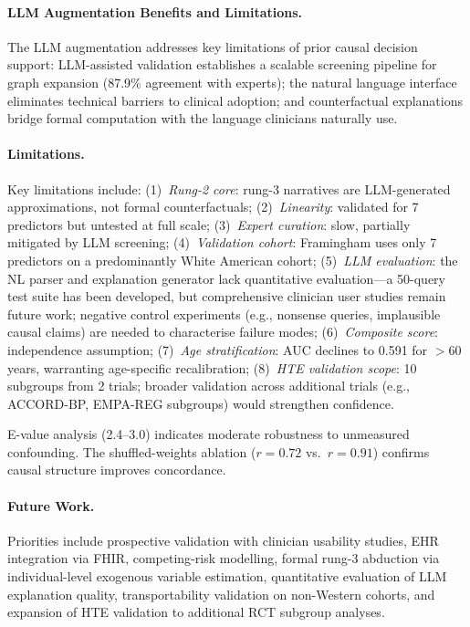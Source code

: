 \documentclass[runningheads]{llncs}
\begin{document}
\paragraph{LLM Augmentation Benefits and Limitations.}
The LLM augmentation addresses key limitations of prior causal
decision support: LLM-assisted validation establishes a scalable
screening pipeline for graph expansion (87.9\% agreement with experts);
the natural language interface eliminates technical barriers to
clinical adoption; and counterfactual explanations bridge formal
computation with the language clinicians naturally use.

\paragraph{Limitations.}
Key limitations include:
(1)~\emph{Rung-2 core}: rung-3 narratives are LLM-generated
approximations, not formal counterfactuals;
(2)~\emph{Linearity}: validated for 7 predictors but untested at
full scale;
(3)~\emph{Expert curation}: slow, partially mitigated by LLM screening;
(4)~\emph{Validation cohort}: Framingham uses only 7 predictors on a
predominantly White American cohort;
(5)~\emph{LLM evaluation}: the NL parser and explanation generator
lack quantitative evaluation---a 50-query test suite has been developed,
but comprehensive clinician user studies remain future work;
negative control experiments (e.g., nonsense queries, implausible
causal claims) are needed to characterise failure modes;
(6)~\emph{Composite score}: independence assumption;
(7)~\emph{Age stratification}: AUC declines to 0.591 for $>$60 years,
warranting age-specific recalibration;
(8)~\emph{HTE validation scope}: 10 subgroups from 2 trials; broader
validation across additional trials (e.g., ACCORD-BP, EMPA-REG
subgroups) would strengthen confidence.

E-value analysis (2.4--3.0) indicates moderate robustness to
unmeasured confounding.
The shuffled-weights ablation ($r = 0.72$ vs.\ $r = 0.91$)
confirms causal structure improves concordance.

\paragraph{Future Work.}
Priorities include prospective validation with clinician usability
studies, EHR integration via FHIR, competing-risk modelling,
formal rung-3 abduction via individual-level exogenous variable
estimation, quantitative evaluation of LLM explanation quality,
transportability validation on non-Western cohorts, and expansion
of HTE validation to additional RCT subgroup analyses.
\end{document}
